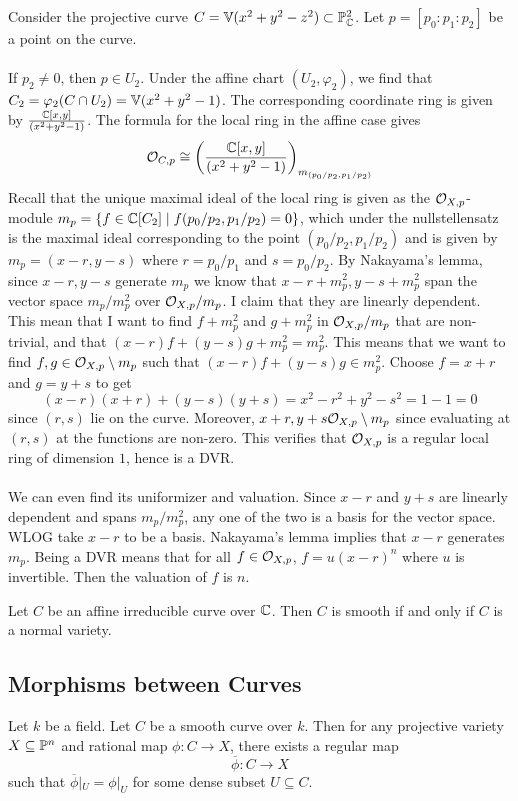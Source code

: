 \documentclass[a4paper]{article}
\begin{document}
\begin{eg}{}{} Consider the projective curve $C=\mathbb{V}(x^2+y^2-z^2)\subset\mathbb{P}_{\mathbb{C}}^2$. Let $p=[p_0:p_1:p_2]$ be a point on the curve. \\~\\

If $p_2\neq 0$, then $p\in U_2$. Under the affine chart $(U_2,\varphi_2)$, we find that $C_2=\varphi_2(C\cap U_2)=\mathbb{V}(x^2+y^2-1)$. The corresponding coordinate ring is given by $\frac{\mathbb{C}[x,y]}{(x^2+y^2-1)}$. The formula for the local ring in the affine case gives $$\mathcal{O}_{C,p}\cong\left(\frac{\mathbb{C}[x,y]}{(x^2+y^2-1)}\right)_{m_{(p_0/p_2,p_1/p_2)}}$$ Recall that the unique maximal ideal of the local ring is given as the $\mathcal{O}_{X,p}$-module $m_p=\{f\in\mathbb{C}[C_2]\;|\;f(p_0/p_2,p_1/p_2)=0\}$, which under the nullstellensatz is the maximal ideal corresponding to the point $(p_0/p_2,p_1/p_2)$ and is given by $m_p=(x-r,y-s)$ where $r=p_0/p_1$ and $s=p_0/p_2$. By Nakayama's lemma, since $x-r,y-s$ generate $m_p$ we know that $x-r+m_p^2,y-s+m_p^2$ span the vector space $m_p/m_p^2$ over $\mathcal{O}_{X,p}/m_p$. I claim that they are linearly dependent. This mean that I want to find $f+m_p^2$ and $g+m_p^2$ in $\mathcal{O}_{X,p}/m_p$ that are non-trivial, and that $(x-r)f+(y-s)g+m_p^2=m_p^2$. This means that we want to find $f,g\in\mathcal{O}_{X,p}\setminus m_p$ such that $(x-r)f+(y-s)g\in m_p^2$. Choose $f=x+r$ and $g=y+s$ to get $$(x-r)(x+r)+(y-s)(y+s)=x^2-r^2+y^2-s^2=1-1=0$$ since $(r,s)$ lie on the curve. Moreover, $x+r,y+s\mathcal{O}_{X,p}\setminus m_p$ since evaluating at $(r,s)$ at the functions are non-zero. This verifies that $\mathcal{O}_{X,p}$ is a regular local ring of dimension $1$, hence is a DVR. \\~\\

We can even find its uniformizer and valuation. Since $x-r$ and $y+s$ are linearly dependent and spans $m_p/m_p^2$, any one of the two is a basis for the vector space. WLOG take $x-r$ to be a basis. Nakayama's lemma implies that $x-r$ generates $m_p$. Being a DVR means that for all $f\in\mathcal{O}_{X,p}$, $f=u(x-r)^n$ where $u$ is invertible. Then the valuation of $f$ is $n$. 
\end{eg}

\begin{prp}{}{} Let $C$ be an affine irreducible curve over $\mathbb{C}$. Then $C$ is smooth if and only if $C$ is a normal variety. 
\end{prp}

\subsection{Morphisms between Curves}
\begin{prp}{}{} Let $k$ be a field. Let $C$ be a smooth curve over $k$. Then for any projective variety $X\subseteq\mathbb{P}^n$ and rational map $\phi:C\to X$, there exists a regular map $$\overline{\phi}:C\to X$$ such that $\overline{\phi}|_U=\phi|_U$ for some dense subset $U\subseteq C$. 
\end{prp}
\end{document}

